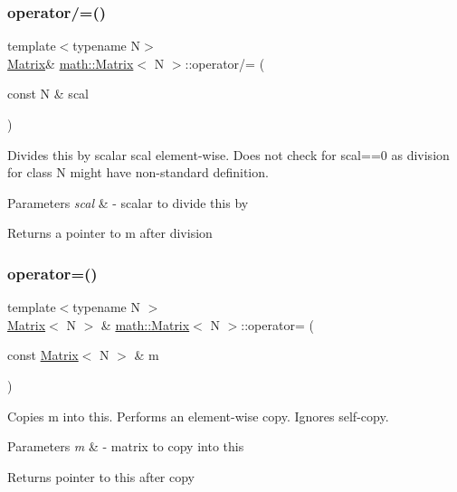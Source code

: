 \subsubsection{\texorpdfstring{operator/=()}{operator/=()}}
{\footnotesize\ttfamily template$<$typename N$>$ \\
\hyperlink{classmath_1_1Matrix}{Matrix}\& \hyperlink{classmath_1_1Matrix}{math\+::\+Matrix}$<$ N $>$\+::operator/= (\begin{DoxyParamCaption}\item[{const N \&}]{scal }\end{DoxyParamCaption})}

Divides {\ttfamily this} by scalar {\ttfamily scal} element-\/wise. Does not check for {\ttfamily scal==0} as division for class {\ttfamily N} might have non-\/standard definition. 
\begin{DoxyParams}{Parameters}
{\em scal} & -\/ scalar to divide {\ttfamily this} by \\
\hline
\end{DoxyParams}
\begin{DoxyReturn}{Returns}
a pointer to {\ttfamily m} after division 
\end{DoxyReturn}
\mbox{\label{classmath_1_1Matrix_a8bf5d371b703ef3023742c4058f709a7}} 
\subsubsection{\texorpdfstring{operator=()}{operator=()}}
{\footnotesize\ttfamily template$<$typename N $>$ \\
\hyperlink{classmath_1_1Matrix}{Matrix}$<$ N $>$ \& \hyperlink{classmath_1_1Matrix}{math\+::\+Matrix}$<$ N $>$\+::operator= (\begin{DoxyParamCaption}\item[{const \hyperlink{classmath_1_1Matrix}{Matrix}$<$ N $>$ \&}]{m }\end{DoxyParamCaption})}

Copies {\ttfamily m} into {\ttfamily this}. Performs an element-\/wise copy. Ignores self-\/copy. 
\begin{DoxyParams}{Parameters}
{\em m} & -\/ matrix to copy into {\ttfamily this} \\
\hline
\end{DoxyParams}
\begin{DoxyReturn}{Returns}
pointer to {\ttfamily this} after copy 
\end{DoxyReturn}
\mbox{\label{classmath_1_1Matrix_a602173645d806afe305ed77b1ff38273}} 
